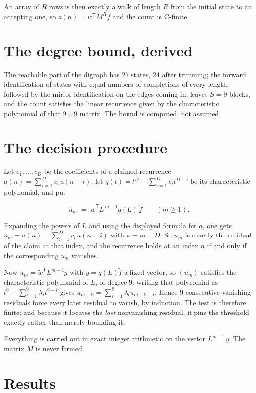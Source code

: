 \documentclass[11pt]{article}
\theoremstyle{definition}
\begin{document}
An array of $R$ rows is then exactly a walk of length $R$ from the initial state to an accepting one, so $a(n) = w^{\mathsf T}M^{R}f$ and the count is C-finite.

\section{The degree bound, derived}

The reachable part of the digraph has $27$ states, $24$ after trimming; the forward identification of states with equal numbers of completions of every length, followed by the mirror identification on the edges coming in, leaves $S = 9$ blocks, and the count satisfies the linear recurrence given by the characteristic polynomial of that $9\times9$ matrix. The bound is computed, not assumed.

\section{The decision procedure}

Let $c_1,\dots,c_D$ be the coefficients of a claimed recurrence $a(n) = \sum_{i=1}^{D} c_i\,a(n-i)$, let $q(t) = t^{D} - \sum_{i=1}^{D} c_i t^{D-i}$ be its characteristic polynomial, and put

\[u_m \;=\; \tilde w^{\mathsf T} L^{\,m-1} q(L)\,\tilde f \qquad (m \ge 1).\]

Expanding the powers of $L$ and using the displayed formula for $a$, one gets $u_m = a(n) - \sum_{i=1}^{D} c_i\,a(n-i)$ with $n = m + D$. So $u_m$ is exactly the residual of the claim at that index, and the recurrence holds at an index $n$ if and only if the corresponding $u_m$ vanishes.

Now $u_m = \tilde w^{\mathsf T} L^{m-1} y$ with $y = q(L)\tilde f$ a fixed vector, so $(u_m)$ satisfies the characteristic polynomial of $L$, of degree $9$: writing that polynomial as $t^{9} - \sum_{i=1}^{9} \lambda_i t^{9-i}$ gives $u_{m+9} = \sum_{i=1}^{9} \lambda_i u_{m+9-i}$. Hence $9$ consecutive vanishing residuals force every later residual to vanish, by induction. The test is therefore finite; and because it locates the {\itshape last} nonvanishing residual, it pins the threshold exactly rather than merely bounding it.

Everything is carried out in exact integer arithmetic on the vector $L^{m-1}y$. The matrix $M$ is never formed.

\section{Results}
\end{document}
